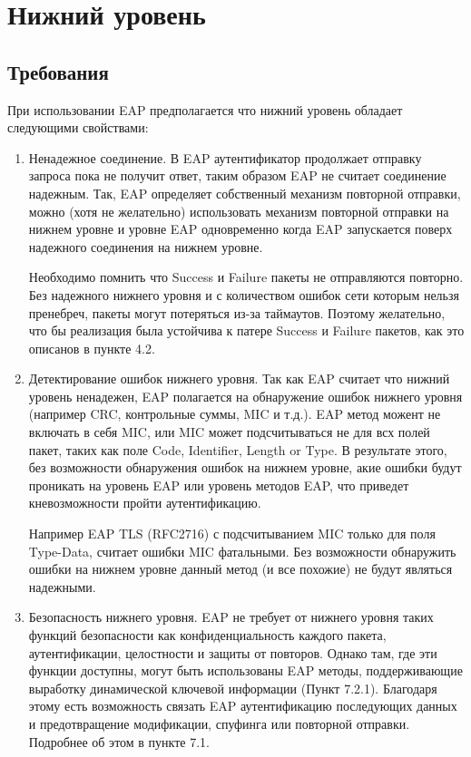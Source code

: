 \section{Нижний уровень}

\subsection{Требования}

При использовании EAP предполагается что нижний уровень обладает следующими свойствами:

\begin{enumerate}
 \item Ненадежное соединение. В EAP аутентификатор продолжает отправку запроса пока не получит ответ, таким образом EAP не считает соединение надежным. Так, EAP определяет собственный механизм повторной отправки, можно (хотя не желательно) использовать механизм повторной отправки на нижнем уровне и уровне EAP одновременно когда EAP запускается поверх надежного соединения на нижнем уровне.

Необходимо помнить что Success и Failure пакеты не отправляются повторно. Без надежного нижнего уровня и с количеством ошибок сети которым нельзя пренебреч, пакеты могут потеряться из-за таймаутов. Поэтому желательно, что бы реализация была устойчива к патере Success и Failure пакетов, как это описанов в пункте 4.2.

 \item Детектирование ошибок нижнего уровня. Так как EAP считает что нижний уровень ненадежен, EAP полагается на обнаружение ошибок нижнего уровня (например CRC, контрольные суммы, MIC и т.д.). EAP метод можент не включать в себя MIC, или MIC может подсчитываться не для всх полей пакет, таких как поле Code, Identifier, Length or Type. В результате этого, без возможности обнаружения ошибок на нижнем уровне, акие ошибки будут проникать на уровень EAP или уровень методов EAP, что приведет кневозможности пройти аутентификацию.

Например EAP TLS (RFC2716) с подсчитыванием MIC только для поля Type-Data, считает ошибки MIC фатальными. Без возможности обнаружить ошибки на нижнем уровне данный метод (и все похожие) не будут являться надежными.

 \item Безопасность нижнего уровня. EAP не требует от нижнего уровня таких функций безопасности как конфиденциальность каждого пакета, аутентификации, целостности и защиты от повторов. Однако там, где эти функции доступны, могут быть использованы EAP методы, поддерживающие выработку динамической ключевой информации (Пункт 7.2.1). Благодаря этому есть возможность связать EAP аутентификацию последующих данных и предотвращение модификации, спуфинга или повторной отправки. Подробнее об этом в пункте 7.1.


\end{enumerate}
